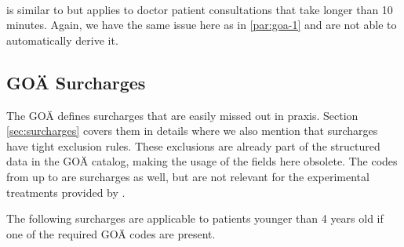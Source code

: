 \paragraph{}
 is similar to  but applies to doctor patient consultations that take longer than 10 minutes.
Again, we have the same issue here as in \ref{par:goa-1} and are not able to automatically derive it.

\subsection{GOÄ Surcharges}\label{subsec:goa-surcharges}
The GOÄ defines surcharges that are easily missed out in praxis.
Section \ref{sec:surcharges} covers them in details where we also mention that surcharges have tight exclusion rules.
These exclusions are already part of the structured data in the GOÄ catalog, making the usage of the  fields here obsolete.
The codes from  up to  are surcharges as well, but are not relevant for the experimental treatments provided by \AV.









The following surcharges are applicable to patients younger than 4 years old if one of the required GOÄ codes are present.



